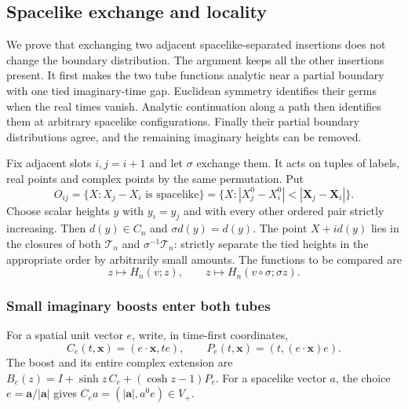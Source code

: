 \subsection{Spacelike exchange and locality}
\label{sec:locality}
We prove that exchanging two adjacent spacelike-separated insertions does
not change the boundary distribution. The argument keeps all the other
insertions present. It first makes the two tube functions analytic near a
partial boundary with one tied imaginary-time gap. Euclidean symmetry
identifies their germs when the real times vanish. Analytic continuation
along a path then identifies them at arbitrary spacelike configurations.
Finally their partial boundary distributions agree, and the remaining
imaginary heights can be removed.

Fix adjacent slots $i,j=i+1$ and let $\sigma$ exchange them. It acts on
tuples of labels, real points and complex points by the same permutation.
Put
\[
 O_{ij}=\{X:X_j-X_i\text{ is spacelike}\}
       =\{X:|X_j^0-X_i^0|<|\mathbf X_j-\mathbf X_i|\}.
\]
Choose scalar heights $y$ with $y_i=y_j$ and with every other ordered
pair strictly increasing. Then $d(y)\in C_n$ and $\sigma d(y)=d(y)$.
The point $X+i d(y)$ lies in the closures of both $\mathcal T_n$ and
$\sigma^{-1}\mathcal T_n$: strictly separate the tied heights in the
appropriate order by arbitrarily small amounts. The functions to be
compared are
\[
 z\longmapsto H_n(v;z),\qquad
 z\longmapsto H_n(v\circ\sigma;\sigma z).
\]

\subsubsection{Small imaginary boosts enter both tubes}
For a spatial unit vector $e$, write, in time-first coordinates,
\[
 C_e(t,\mathbf x)=(e\cdot\mathbf x,te),\qquad
 P_e(t,\mathbf x)=(t,(e\cdot\mathbf x)e).
\]
The boost and its entire complex extension are
$B_e(z)=I+\sinh z\,C_e+(\cosh z-1)P_e$.
For a spacelike vector $a$, the choice
$e=\mathbf a/|\mathbf a|$ gives
$C_ea=(|\mathbf a|,a^0e)\in V_+$.

